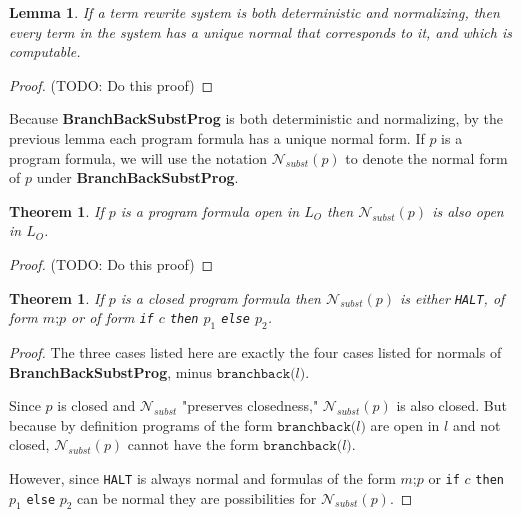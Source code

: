 \documentclass[11pt]{article}
\begin{document}
\newtheorem*{uniquenormal}{Lemma}
\begin{uniquenormal}
If a term rewrite system is both deterministic and normalizing, then every term in the system has a unique normal that corresponds to it, and which is computable.
\end{uniquenormal}

\begin{proof}
(TODO: Do this proof)
\end{proof}

Because \textbf{BranchBackSubstProg} is both deterministic and normalizing, by the previous lemma each program formula has a unique normal form.  If $p$ is a program formula, we will use the notation $\mathcal{N}_{subst}(p)$ to denote the normal form of $p$ under \textbf{BranchBackSubstProg}.

\newtheorem*{nsubstpreservesopenness}{Theorem}
\begin{nsubstpreservesopenness}
If $p$ is a program formula open in $L_{O}$ then $\mathcal{N}_{subst}(p)$ is also open in $L_{O}$.
\end{nsubstpreservesopenness}

\begin{proof}
(TODO: Do this proof)
\end{proof}

\newtheorem*{openformulanormalforms}{Theorem}
\begin{openformulanormalforms}
If $p$ is a closed program formula then $\mathcal{N}_{subst}(p)$ is either \texttt{HALT}, of form $m\texttt{;}p$ or of form \texttt{if} $c$ \texttt{then} $p_{1}$ \texttt{else} $p_{2}$.
\end{openformulanormalforms}

\begin{proof}
The three cases listed here are exactly the four cases listed for normals of \textbf{BranchBackSubstProg}, minus $\texttt{branchback(}l\texttt{)}$.

Since $p$ is closed and $\mathcal{N}_{subst}$ "preserves closedness," $\mathcal{N}_{subst}(p)$ is also closed.  But because by definition programs of the form $\texttt{branchback(}l\texttt{)}$ are open in ${l}$ and not closed, $\mathcal{N}_{subst}(p)$ cannot have the form $\texttt{branchback(}l\texttt{)}$.

However, since \texttt{HALT} is always normal and formulas of the form $m\texttt{;}p$ or \texttt{if} $c$ \texttt{then} $p_{1}$ \texttt{else} $p_{2}$ can be normal they are possibilities for $\mathcal{N}_{subst}(p)$.
\end{proof}
\end{document}
